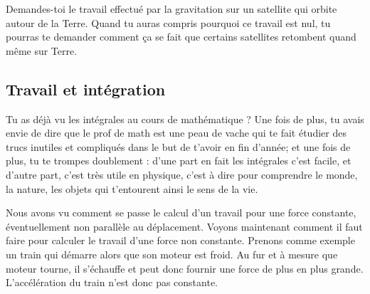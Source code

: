\begin{exercice}
Demandes-toi le travail effectué par la gravitation sur un satellite qui orbite autour de la Terre. Quand tu auras compris pourquoi ce travail est nul, tu pourras te demander comment ça se fait que certains satellites retombent quand même sur Terre.
\end{exercice}


\subsection{Travail et intégration}

Tu as déjà vu les intégrales au cours de mathématique ? Une fois de plus, tu avais envie de dire que le prof de math est une peau de vache qui te fait étudier des trucs inutiles et compliqués dans le but de t'avoir en fin d'année; et une fois de plus, tu te trompes doublement : d'une part en fait les intégrales c'est facile, et d'autre part, c'est très utile en physique, c'est à dire pour comprendre le monde, la nature, les objets qui t'entourent ainsi le sens de la vie.

Nous avons vu comment se passe le calcul d'un travail pour une force constante, éventuellement non parallèle au déplacement. Voyons maintenant comment il faut faire pour calculer le travail d'une force non constante. Prenons comme exemple un train qui démarre alors que son moteur est froid. Au fur et à mesure que moteur tourne, il s'échauffe et peut donc fournir une force de plus en plus grande. L'accélération du train n'est donc pas constante.

